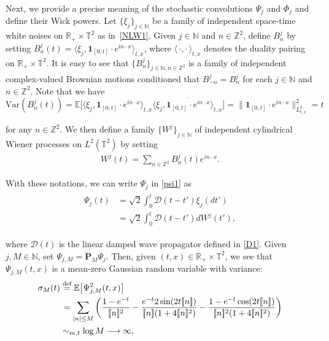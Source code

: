 \documentclass[letterpaper, 11pt,  reqno]{amsart}
\newcommand{\1}{\hspace{0.5mm}\text{I}\hspace{0.2mm}}
\newcommand{\noi}{\noindent}
\newcommand{\R}{\mathbb{R}}
\newcommand{\T}{\mathbb{T}}
\newcommand{\Z}{\mathbb{Z}}
\newcommand{\N}{\mathbb{N}}
\newcommand{\E}{\mathbb{E}}
\newcommand{\D}{\mathcal{D}}
\newcommand{\ind}{\mathbf 1}
\newcommand{\cj}{\overline}
\renewcommand{\P}{\mathbf{P}}
\newcommand{\jb}[1]{\langle #1 \rangle}
\newcommand{\jbb}[1]{[\hspace{-0.6mm}[ #1 ]\hspace{-0.6mm}]}
\newcommand{\deff}{\stackrel{\textup{def}}{=}}
\newcommand{\too}{\longrightarrow}
\numberwithin{equation}{section}
\numberwithin{theorem}{section}
\begin{document}
Next, we provide  a precise meaning of the stochastic convolutions
$\Psi_j$ and $\Phi_j$
and define their Wick powers.
Let $\{ \xi_j\}_{j \in \N}$
be a family of 
independent space-time white noises on 
$\R_+ \times \T^2$
as in~\eqref{NLW1}.
Given $j \in \N$
and $n \in \Z^2$, 
define $B_n^j$
by setting
$B_n^j (t) =  \jb{ \xi_j, \ind_{[0, t]} \cdot e^{i n \cdot x} }_{t, x}$, 
where  
 $\jb{\,\cdot, \cdot\,}_{t, x}$ denotes 
the duality pairing on $ \R_+\times \T^2$.
It is easy
to see that 
$\{ B_n^j \}_{j  \in \N, n \in \Z^2}$ is a family of  independent complex-valued
Brownian motions conditioned  that $B^j_{-n} = \cj{B^j_n}$
for each  $j \in \N$ and $n \in \Z^2$. 
Note that we have
 \[\text{Var}(B^j_n(t)) = \E\Big[
 \jb{\xi_j, \ind_{[0, t]} \cdot e^{in \cdot x}}_{t, x}\cj{\jb{\xi_j, \ind_{[0, t]} \cdot e^{in \cdot x}}_{ t, x}}
 \Big] = \|\ind_{[0, t]} \cdot e^{in \cdot x}\|_{L^2_{t, x}}^2 = t\]

\noi
 for any $n \in \Z^2$.
 We then define  
a family 
$\{  W^j\}_{j \in \N}$
of independent cylindrical Wiener processes on $L^2(\T^2)$
by setting
\begin{align*}
 W^j(t)
 = \sum_{n \in \Z^2} B_n^j (t) e^{in \cdot x}.
\end{align*}




With these notations, we can write 
 $\Psi_j$  in \eqref{psi1}
as 
\begin{align}
\begin{split}
\Psi_j (t) 
& =
\sqrt 2  \int_0^t \D (t - t') \xi_j (dt')\\
& = \sqrt 2  \int_0^t \D (t - t') d W^j (t'),
\end{split}
\label{psi2}
\end{align}

\noi 
where $\D (t)$ is 
 the linear damped wave propagator defined  in \eqref{D1}.
Given  $j, M \in \N$, set $\Psi_{j, M} = \P_M \Psi_j$. 
Then, given $(t, x) \in \R_+ \times \T^2$, 
we see that 
$\Psi_{j, M}(t, x)$ is a mean-zero Gaussian random variable with variance:
\begin{align}
\begin{split}
\sigma_M (t)
    & \deff \E \big[ \Psi_{j, M}^2 (t, x) \big] \\
& \hspace{0.5mm}
= 
\sum_{|n| \le M} 
\bigg(
\frac {1 - e^{- t}}{\jbb{n}^2}   
-
\frac {e^{- t}2 \sin(2 t \jbb{n})}{\jbb{n} (1 + 4\jbb{n}^2)}
- 
\frac {1 - e^{- t} \cos(2 t \jbb{n})}{\jbb{n}^2(1 + 4 \jbb{n}^2)} 
\bigg)    \\
&  \sim_{m, t} \log M 
\too \infty, 
\end{split} 
\label{sig1}
\end{align}
\end{document}
